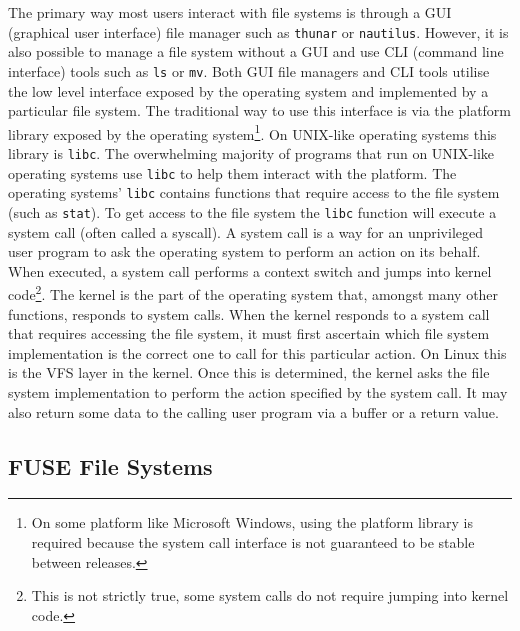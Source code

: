 The primary way most users interact with file systems is through a GUI
(graphical user interface) file manager such as \texttt{thunar} or
\texttt{nautilus}. 
However, it is also possible to manage a file system without a GUI and use CLI
(command line interface) tools such as \texttt{ls} or \texttt{mv}. Both GUI
file managers and CLI tools utilise the low level interface exposed by the
operating system and implemented by a particular file system. The traditional
way to use this interface is via the platform library exposed by the operating
system\footnote{On some platform like Microsoft Windows, using the platform
library is required because the system call interface is not guaranteed to be
stable between releases.}.  On
UNIX-like operating systems this library is \texttt{libc}\cite{libc}.  The overwhelming majority of programs that run on UNIX-like
operating systems use \texttt{libc} to help them interact with the platform.
The operating systems' \texttt{libc} contains functions that require access to
the file system (such as \texttt{stat}\cite{stat-syscall}). To get access to
the file system the \texttt{libc} function will execute a system
call\cite{syscalls} (often called a syscall). A system call is a way for an
unprivileged user program to ask the operating system to perform an action on
its behalf. When executed, a system call performs a context switch
 and jumps into kernel
code\footnote{This is not strictly true, some system calls do not require jumping
into kernel code.}.
The kernel is the part of the operating system that, amongst many other
functions, responds to system calls. When the kernel responds to a system call
that requires accessing the file system, it must first ascertain which file
system implementation is the correct one to call for this particular action.
On Linux this is the VFS layer in the kernel\cite{kernel-vfs}. Once this is
determined, the kernel asks the file system implementation to perform the
action specified by the system call. It may also return some data to the
calling user program via a buffer or a return value.

\subsection{FUSE File Systems}

